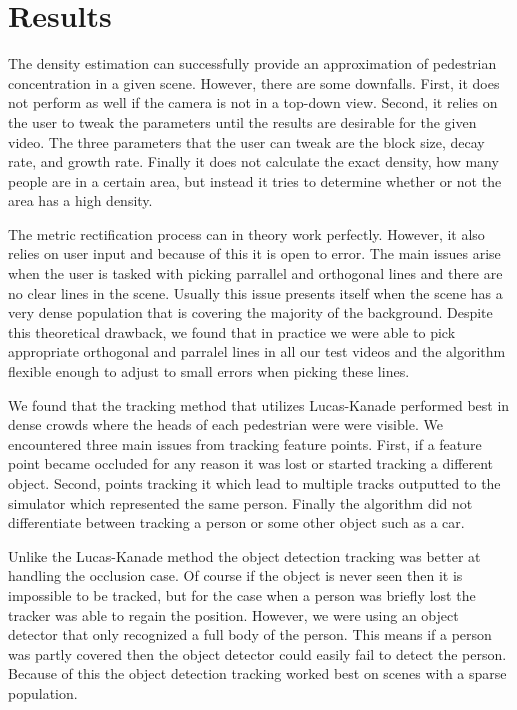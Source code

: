 \documentclass[12pt, onecolumn, conference]{IEEEtran}
\begin{document}
\section{Results}

The density estimation can successfully provide an approximation of pedestrian concentration in a given scene. However, there are some downfalls. First, it does not perform as well if the camera is not in a top-down view. Second, it relies on the user to tweak the parameters until the results are desirable for the given video. The three parameters that the user can tweak are the block size, decay rate, and growth rate. Finally it does not calculate the exact density, how many people are in a certain area, but instead it tries to determine whether or not the area has a high density.

The metric rectification process can in theory work perfectly. However, it also relies on user input and because of this it is open to error. The main issues arise when the user is tasked with picking parrallel and orthogonal lines and there are no clear lines in the scene. Usually this issue presents itself when the scene has a very dense population that is covering the majority of the background. Despite this theoretical drawback, we found that in practice we were able to pick appropriate orthogonal and parralel lines in all our test videos and the algorithm flexible enough to adjust to small errors when picking these lines.

We found that the tracking method that utilizes Lucas-Kanade performed best in dense crowds where the heads of each pedestrian were were visible. We encountered three main issues from tracking feature points. First, if a feature point became occluded for any reason it was lost or started tracking a different object. Second,  points tracking it which lead to multiple tracks outputted to the simulator which represented the same person. Finally the algorithm did not differentiate between tracking a person or some other object such as a car.

Unlike the Lucas-Kanade method the object detection tracking was better at handling the occlusion case. Of course if the object is never seen then it is impossible to be tracked, but for the case when a person was briefly lost the tracker was able to regain the position. However, we were using an object detector that only recognized a full body of the person. This means if a person was partly covered then the object detector could easily fail to detect the person. Because of this the object detection tracking worked best on scenes with a sparse population.
\end{document}
